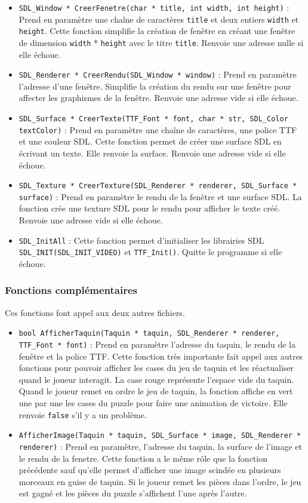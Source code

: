 \documentclass[11pt]{article}
\begin{document}
\begin{itemize}
\item \texttt{SDL\_Window * CreerFenetre(char * title, int width, int height)} : Prend en paramètre une chaîne de caractères \texttt{title} et deux entiers \texttt{width} et \texttt{height}. Cette fonction simplifie la création de fenêtre en créant une fenêtre de dimension \texttt{width} * \texttt{height} avec le titre \texttt{title}. Renvoie une adresse nulle si elle échoue.
\item \texttt{SDL\_Renderer * CreerRendu(SDL\_Window * window)} : Prend en paramètre l'adresse d'une fenêtre. Simplifie la création du rendu sur une fenêtre pour affecter les graphismes de la fenêtre. Renvoie une adresse vide si elle échoue.
\item \texttt{SDL\_Surface * CreerTexte(TTF\_Font * font, char * str, SDL\_Color textColor)} : Prend en paramètre une chaîne de caractères, une police TTF et une couleur SDL. Cette fonction permet de créer une surface SDL en écrivant un texte. Elle renvoie la surface. Renvoie une adresse vide si elle échoue.
\item \texttt{SDL\_Texture * CreerTexture(SDL\_Renderer * renderer, SDL\_Surface * surface)} : Prend en paramètre le rendu de la fenêtre et une surface SDL. La fonction crée une texture SDL pour le rendu pour afficher le texte créé. Renvoie une adresse vide si elle échoue.
\item \texttt{SDL\_InitAll} : Cette fonction permet d'initialiser les librairies SDL \texttt{SDL\_INIT(SDL\_INIT\_VIDEO)} et \texttt{TTF\_Init()}. Quitte le programme si elle échoue.
\end{itemize}

\subsubsection{Fonctions complémentaires}
\label{sec:org2d23125}

Ces fonctions font appel aux deux autres fichiers.

\begin{itemize}
\item \texttt{bool AfficherTaquin(Taquin * taquin, SDL\_Renderer * renderer, TTF\_Font * font)} : Prend en paramètre l'adresse du taquin, le rendu de la fenêtre et la police TTF. Cette fonction très importante fait appel aux autres fonctions pour pouvoir afficher les cases du jeu de taquin et les réactualiser quand le joueur interagit. La case rouge représente l'espace vide du taquin. Quand le joueur remet en ordre le jeu de taquin, la fonction affiche en vert une par une les cases du puzzle pour faire une animation de victoire. Elle renvoie \texttt{false} s'il y a un problème.
\item \texttt{AfficherImage(Taquin * taquin, SDL\_Surface * image, SDL\_Renderer * renderer)} : Prend en paramètre, l'adresse du taquin, la surface de l'image et le rendu de la fenetre. Cette fonction a le même rôle que la fonction précédente sauf qu'elle permet d'afficher une image scindée en plusieurs morceaux en guise de taquin. Si le joueur remet les pièces dans l'ordre, le jeu est gagné et les pièces du puzzle s'affichent l'une après l'autre.
\end{itemize}
\end{document}
